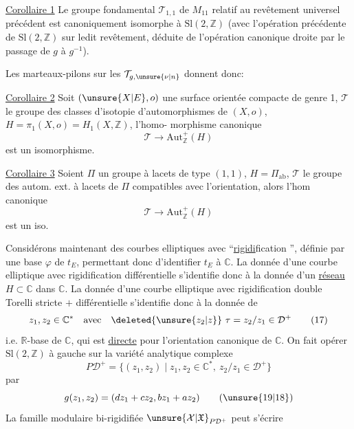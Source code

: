 \uline{Corollaire 1} Le groupe fondamental $\mathcal T_{1,1}$ de
$M_{11}$ relatif au revêtement universel précédent
est canoniquement isomorphe à $\mathrm{Sl}(2,\mathbb Z)$
(avec l'opération précédente  de $\mathrm{Sl}(2,\mathbb Z)$ sur
ledit revêtement, déduite de l'opération
canonique  droite par le passage de $g$ à $g^{-1}$\unsure{\ldots}).

Les marteaux-pilons sur les $\mathcal T_{g,\unsure{\nu|n}}$
donnent donc:

\uline{Corollaire 2} Soit $(\unsure{X|E},o)$ une surface orientée
compacte de genre 1, $\mathcal T$ le groupe des
classes d'isotopie d'automorphismes de $(X,o)$,
$H=\pi_1(X,o)=H_1(X,\mathbb Z)$,   l'homo-
morphisme canonique
\[
\mathcal T\longrightarrow\mathrm{Aut}_{\mathbb Z}^+(H)
\tag{16}
\]
est un isomorphisme.

\uline{Corollaire 3} Soient $\Pi$ un groupe à lacets
de type $(1,1)$, $H=\Pi_{\mathrm{ab}}$, $\mathcal T$ le groupe des
autom. ext. à lacets de $\Pi$ compatibles avec
l'orientation, alors l'hom canonique
\[
\mathcal T\longrightarrow\mathrm{Aut}_{\mathbb Z}^+(H)
\]
est un iso.

Considérons maintenant des courbes elliptiques
 avec ``\uline{rigidi}fication '', définie
par une base $\varphi$ de $t_E$, permettant donc
d'identifier $t_E$ à $\mathbb C$. La donnée d'une
courbe elliptique avec rigidification différentielle
s'identifie donc à la donnée d'un \uline{réseau}
$H\subset\mathbb C$ dans $\mathbb C$. La donnée d'une courbe
elliptique avec rigidification double Torelli
stricte $+$ différentielle s'identifie donc à
la donnée de
\[
z_1,z_2\in\mathbb C^*
\quad\text{avec}\quad
\deleted{\unsure{z_2|z}}\ \tau=z_2/z_1\in\mathcal D^+
\tag{17}
\]
i.e. 
$\mathbb R$-base de $\mathbb C$,
qui est \uline{directe} pour l'orientation canonique
de $\mathbb C$. On fait opérer $\mathrm{Sl}(2,\mathbb Z)$ à
gauche sur la variété analytique
complexe
\[
P\mathcal D^+=\{(z_1,z_2)\mid z_1,z_2\in\mathbb C^*,\ z_2/z_1\in\mathcal D^+\}
\tag{18}
\]
par
\[
g(z_1,z_2)=(dz_1+cz_2,bz_1+az_2)
\tag{\unsure{19|18}}
\]
La famille modulaire bi-rigidifiée $\unsure{\mathcal X|\mathfrak X}_{P\mathcal D^+}$
peut s'écrire

